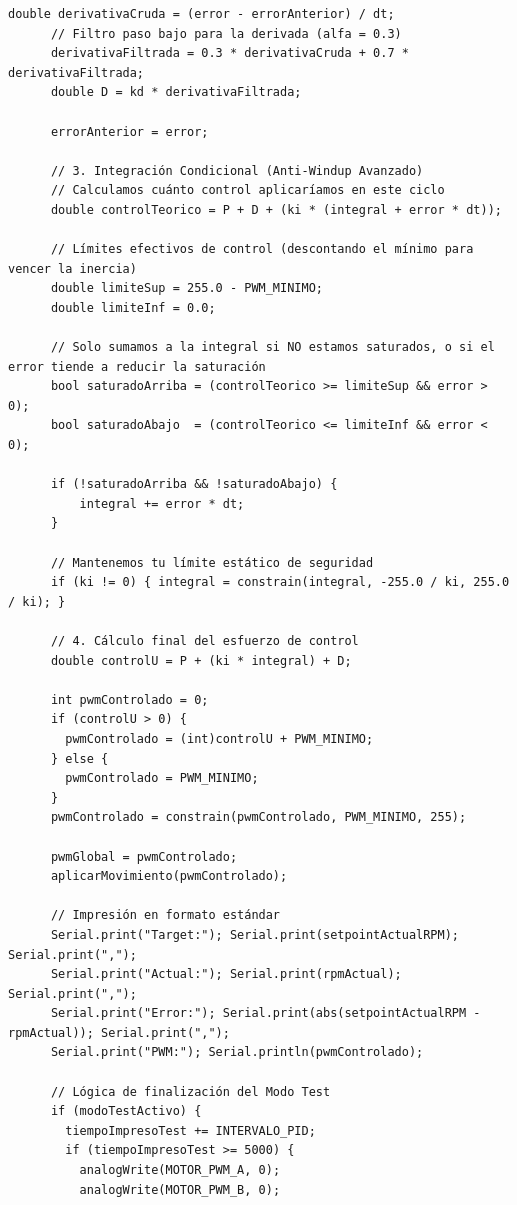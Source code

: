 \documentclass[11pt, letterpaper]{article}
\begin{document}
\begin{lstlisting}[caption={main.cpp --- PID + MQTT + publicaci\'on a InfluxDB}]
      double derivativaCruda = (error - errorAnterior) / dt;
      // Filtro paso bajo para la derivada (alfa = 0.3)
      derivativaFiltrada = 0.3 * derivativaCruda + 0.7 * derivativaFiltrada;
      double D = kd * derivativaFiltrada;
      
      errorAnterior = error;

      // 3. Integración Condicional (Anti-Windup Avanzado)
      // Calculamos cuánto control aplicaríamos en este ciclo
      double controlTeorico = P + D + (ki * (integral + error * dt));
      
      // Límites efectivos de control (descontando el mínimo para vencer la inercia)
      double limiteSup = 255.0 - PWM_MINIMO;
      double limiteInf = 0.0;
      
      // Solo sumamos a la integral si NO estamos saturados, o si el error tiende a reducir la saturación
      bool saturadoArriba = (controlTeorico >= limiteSup && error > 0);
      bool saturadoAbajo  = (controlTeorico <= limiteInf && error < 0);
      
      if (!saturadoArriba && !saturadoAbajo) {
          integral += error * dt;
      }

      // Mantenemos tu límite estático de seguridad
      if (ki != 0) { integral = constrain(integral, -255.0 / ki, 255.0 / ki); }
      
      // 4. Cálculo final del esfuerzo de control
      double controlU = P + (ki * integral) + D;
      
      int pwmControlado = 0;
      if (controlU > 0) {
        pwmControlado = (int)controlU + PWM_MINIMO;
      } else {
        pwmControlado = PWM_MINIMO; 
      }
      pwmControlado = constrain(pwmControlado, PWM_MINIMO, 255);
      
      pwmGlobal = pwmControlado;
      aplicarMovimiento(pwmControlado);

      // Impresión en formato estándar
      Serial.print("Target:"); Serial.print(setpointActualRPM); Serial.print(",");
      Serial.print("Actual:"); Serial.print(rpmActual); Serial.print(",");
      Serial.print("Error:"); Serial.print(abs(setpointActualRPM - rpmActual)); Serial.print(",");
      Serial.print("PWM:"); Serial.println(pwmControlado);

      // Lógica de finalización del Modo Test
      if (modoTestActivo) {
        tiempoImpresoTest += INTERVALO_PID;
        if (tiempoImpresoTest >= 5000) {
          analogWrite(MOTOR_PWM_A, 0);
          analogWrite(MOTOR_PWM_B, 0);
          

\end{lstlisting}
\end{document}
